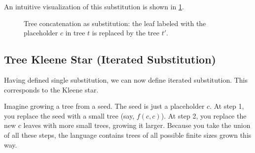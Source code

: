 An intuitive visualization of this substitution is shown in \cref{fig:tree-concatenation}.

\begin{figure}[H]
\centering
{}
\caption{Tree concatenation as substitution: the leaf labeled with the placeholder $c$ in tree $t$ is replaced by the tree $t'$.}
\label{fig:tree-concatenation}
\end{figure}

\subsection{Tree Kleene Star (Iterated Substitution)}
Having defined single substitution, we can now define iterated substitution. This corresponds to the Kleene star.

Imagine growing a tree from a seed. The seed is just a placeholder $c$. At step 1, you replace the seed with a small tree (say, $f(c,c)$). At step 2, you replace the new $c$ leaves with more small trees, growing it larger. Because you take the union of all these steps, the language contains trees of all possible finite sizes grown this way.

